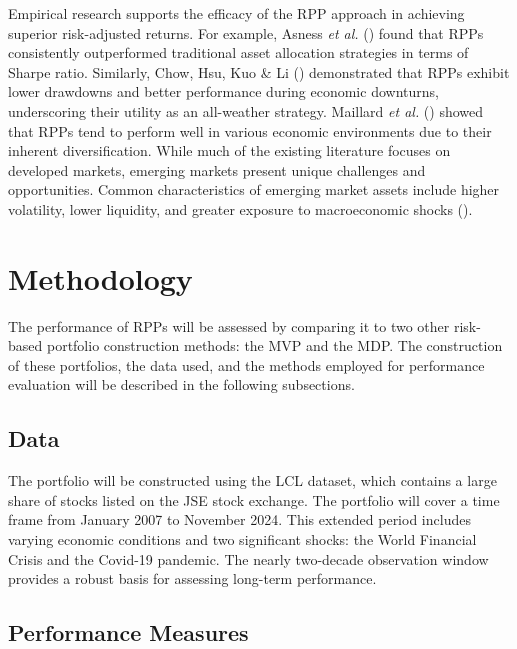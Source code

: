 \documentclass[11pt,preprint]{elsarticle}
\numberwithin{equation}{section}
\numberwithin{figure}{section}
\numberwithin{table}{section}
\begin{document}
Empirical research supports the efficacy of the RPP approach in
achieving superior risk-adjusted returns. For example, Asness \emph{et
al.} () found that RPPs
consistently outperformed traditional asset allocation strategies in
terms of Sharpe ratio. Similarly, Chow, Hsu, Kuo \& Li
() demonstrated that RPPs exhibit
lower drawdowns and better performance during economic downturns,
underscoring their utility as an all-weather strategy. Maillard \emph{et
al.} () showed that RPPs tend
to perform well in various economic environments due to their inherent
diversification. While much of the existing literature focuses on
developed markets, emerging markets present unique challenges and
opportunities. Common characteristics of emerging market assets include
higher volatility, lower liquidity, and greater exposure to
macroeconomic shocks ().

\section{Methodology}\label{methodology}

The performance of RPPs will be assessed by comparing it to two other
risk-based portfolio construction methods: the MVP and the MDP. The
construction of these portfolios, the data used, and the methods
employed for performance evaluation will be described in the following
subsections.

\subsection{Data}\label{data}

The portfolio will be constructed using the LCL dataset, which contains
a large share of stocks listed on the JSE stock exchange. The portfolio
will cover a time frame from January 2007 to November 2024. This
extended period includes varying economic conditions and two significant
shocks: the World Financial Crisis and the Covid-19 pandemic. The nearly
two-decade observation window provides a robust basis for assessing
long-term performance.

\subsection{Performance Measures}\label{performance-measures}
\end{document}
